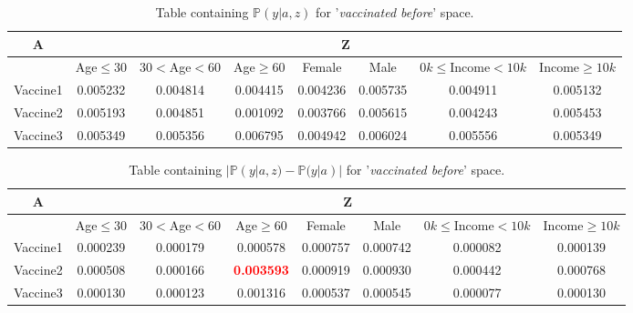 \documentclass{article}
\begin{document}
\begin{center}
    \begin{table}[H]
    \begin{adjustbox}{max width=\textwidth}
        \begin{tabular}{ |c| c c c c c c c|}
            \hline
            A  & \multicolumn{7}{c|}{Z} \\
            \hline
            & Age$\leq30$ &    $30<$Age$<60$ &     Age$\geq60$ &    Female &      Male &   $0k\leq$Income$<10k$ &    Income$\geq10k$  \\
            \hline
            Vaccine1 &  0.005232 &  0.004814 &  0.004415 &  0.004236 &  0.005735 &  0.004911 &  0.005132 \\
            Vaccine2 &  0.005193 &  0.004851 &  0.001092 &  0.003766 &  0.005615 &  0.004243 &  0.005453 \\
            Vaccine3 &  0.005349 &  0.005356 &  0.006795 &  0.004942 &  0.006024 &  0.005556 &  0.005349 \\
            \hline
        \end{tabular}
        \end{adjustbox}
    \caption{Table containing $\mathbb{P}(y | a, z)$ for '\textit{vaccinated before}' space.}
    \label{tab:pyaz vaccinated before}
    \end{table}
\end{center}

\begin{center}
\begin{table}[H]
\begin{adjustbox}{max width=\textwidth}
    \begin{tabular}{ |c| c c c c c c c|}
        \hline
          A  & \multicolumn{7}{c|}{Z} \\
          \hline
          & Age$\leq30$ &    $30<$Age$<60$ &     Age$\geq60$ &    Female &      Male &   $0k\leq$Income$<10k$ &    Income$\geq10k$  \\
        \hline
        Vaccine1 &  0.000239 &  0.000179 &  0.000578 &  0.000757 &  0.000742 &  0.000082 &  0.000139 \\
        Vaccine2 &  0.000508 &  0.000166 &  \textbf{\textcolor{red}{0.003593}} &  0.000919 &  0.000930 &  0.000442 &  0.000768 \\
        Vaccine3 &  0.000130 &  0.000123 &  0.001316 &  0.000537 &  0.000545 &  0.000077 &  0.000130
         \\ \hline
    \end{tabular}
    \end{adjustbox}
    \caption{Table containing $| \mathbb{P}(y | a, z) - \mathbb{P}(y | a) |$ for '\textit{vaccinated before}' space.}
    \label{tab:diff2}
\end{table}
\end{center}
\end{document}
